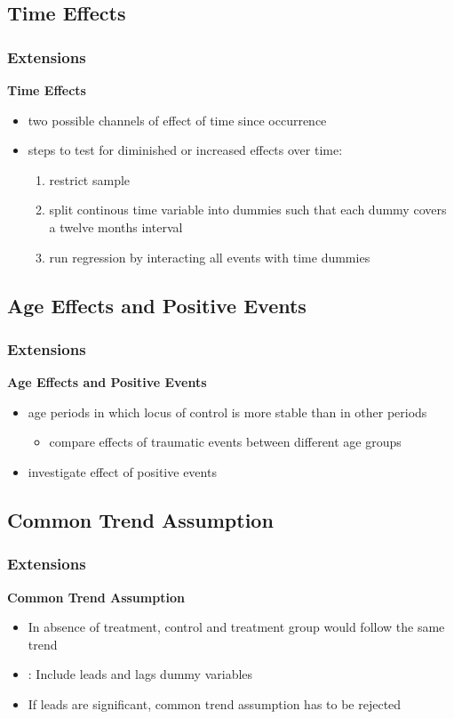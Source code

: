 \documentclass{beamer}
\begin{document}
\subsection{Time Effects} %
\label{sub:time_effects}
\begin{frame}[t]\frametitle{Extensions}
\textbf{Time Effects}
\begin{itemize}
	\item<+-> two possible channels of effect of time since occurrence
	\item<+-> steps to test for diminished or increased effects over time:
	\begin{enumerate}
		\item restrict sample
		\item split continous time variable into dummies such that each dummy covers a twelve months interval
		\item run regression by interacting all events with time dummies
	\end{enumerate}
\end{itemize}
\end{frame}

\subsection{Age Effects and Positive Events} %
\label{sub:age_effects_positive_events}
\begin{frame}[t]\frametitle{Extensions}
\textbf{Age Effects and Positive Events}
\begin{itemize}
	\item<+-> age periods in which locus of control is more stable than in other periods
	\begin{itemize}
		\item compare effects of traumatic events between different age groups
	\end{itemize}
	\item<+-> investigate effect of positive events
	\end{itemize}
\end{frame}

\subsection{Common Trend Assumption} %
\label{sub:common_trend_assumption}

\begin{frame}[t]\frametitle{Extensions}

\textbf{Common Trend Assumption}
\begin{itemize}[<+->]
    \item In absence of treatment, control and treatment group would follow the same trend
    \item \citet{autor2003}: Include leads and lags dummy variables
    \item If leads are significant, common trend assumption has to be rejected
\end{itemize}

\end{frame}
\end{document}
